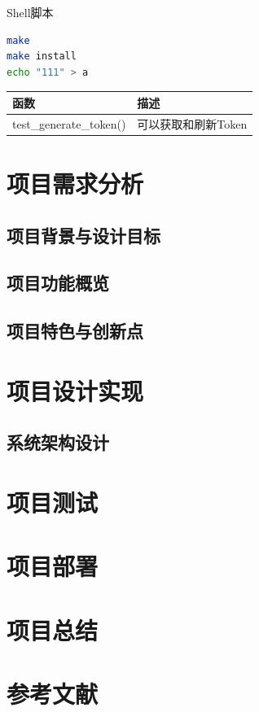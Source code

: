 \documentclass{ctexart}
\begin{document}
\noindent Shell脚本
\begin{lstlisting}[language=Bash]
make
make install
echo "111" > a
\end{lstlisting}

\begin{table}[H]
    \centering
    \begin{tabular}{lp{8cm}}
    \toprule
    \textbf{函数} & \textbf{描述} \\
    \midrule
    test\_generate\_token() & 可以获取和刷新Token \\
    \bottomrule
    \end{tabular}
\end{table}

\linespread{1.5}\newpage

\thispagestyle{empty}\tableofcontents\newpage

\section{项目需求分析}

\subsection{项目背景与设计目标}

\subsection{项目功能概览}

\subsection{项目特色与创新点}

\section{项目设计实现}

\subsection{系统架构设计}

\section{项目测试}

\section{项目部署}

\section{项目总结}

\section*{参考文献}


\end{document}
